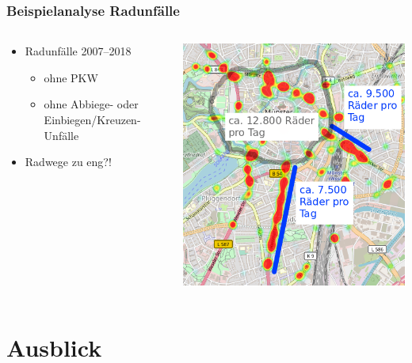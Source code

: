 \documentclass{beamer}
\begin{document}
\begin{frame}
  \frametitle{Beispielanalyse Radunfälle}
  \centering
  \begin{columns}
    \begin{column}{0.5\textwidth}
      \begin{itemize}
    \item Radunfälle 2007--2018
    \begin{itemize}
      \item ohne PKW
      \item ohne Abbiege- oder Einbiegen/Kreuzen-Unfälle
    \end{itemize}
    \item<2> Radwege zu eng?!
  \end{itemize}
    \end{column}
    \begin{column}{0.5\textwidth}
      \includegraphics[width=\textwidth]{img/radwege-unfaelle.png}
    \end{column}
  \end{columns} 
\end{frame}

\section{Ausblick}
\end{document}
